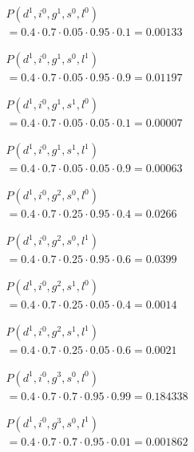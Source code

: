 $\begin{array}{l}
    P(d^1, i^0, g^1, s^0, l^0) \\
    = 0.4 \cdot 0.7 \cdot 0.05 \cdot 0.95 \cdot 0.1 = 0.00133
\end{array}$

$\begin{array}{l}
    P(d^1, i^0, g^1, s^0, l^1) \\
    = 0.4 \cdot 0.7 \cdot 0.05 \cdot 0.95 \cdot 0.9 = 0.01197
\end{array}$

$\begin{array}{l}
    P(d^1, i^0, g^1, s^1, l^0) \\
    = 0.4 \cdot 0.7 \cdot 0.05 \cdot 0.05 \cdot 0.1 = 0.00007
\end{array}$

$\begin{array}{l}
    P(d^1, i^0, g^1, s^1, l^1) \\
    = 0.4 \cdot 0.7 \cdot 0.05 \cdot 0.05 \cdot 0.9 = 0.00063
\end{array}$

$\begin{array}{l}
    P(d^1, i^0, g^2, s^0, l^0) \\
    = 0.4 \cdot 0.7 \cdot 0.25 \cdot 0.95 \cdot 0.4 = 0.0266
\end{array}$

$\begin{array}{l}
    P(d^1, i^0, g^2, s^0, l^1) \\
    = 0.4 \cdot 0.7 \cdot 0.25 \cdot 0.95 \cdot 0.6 = 0.0399
\end{array}$

$\begin{array}{l}
    P(d^1, i^0, g^2, s^1, l^0) \\
    = 0.4 \cdot 0.7 \cdot 0.25 \cdot 0.05 \cdot 0.4 = 0.0014
\end{array}$

$\begin{array}{l}
    P(d^1, i^0, g^2, s^1, l^1) \\
    = 0.4 \cdot 0.7 \cdot 0.25 \cdot 0.05 \cdot 0.6 = 0.0021
\end{array}$

$\begin{array}{l}
    P(d^1, i^0, g^3, s^0, l^0) \\
    = 0.4 \cdot 0.7 \cdot 0.7 \cdot 0.95 \cdot 0.99 = 0.184338
\end{array}$

$\begin{array}{l}
    P(d^1, i^0, g^3, s^0, l^1) \\
    = 0.4 \cdot 0.7 \cdot 0.7 \cdot 0.95 \cdot 0.01 = 0.001862
\end{array}$

